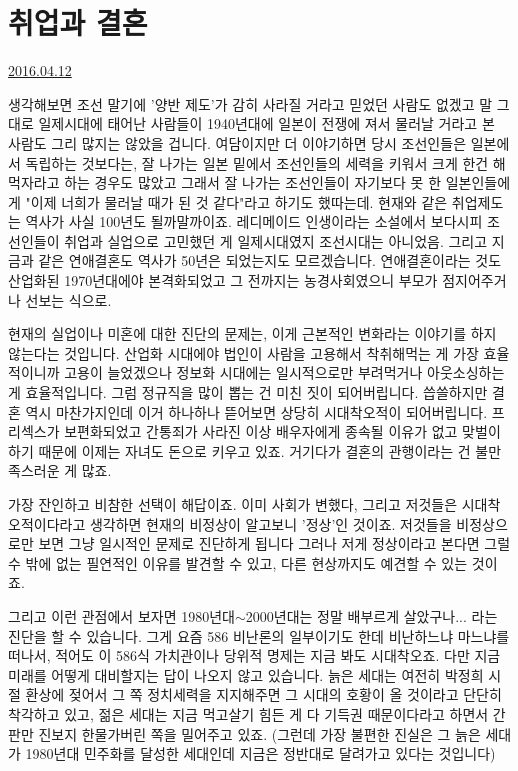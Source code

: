\section{취업과 결혼}
\href{https://www.kockoc.com/Apoc/724863}{2016.04.12}

\vspace{5mm}

생각해보면 조선 말기에 '양반 제도'가 감히 사라질 거라고 믿었던 사람도 없겠고
말 그대로 일제시대에 태어난 사람들이 1940년대에 일본이 전쟁에 져서 물러날 거라고 본 사람도 그리 많지는 않았을 겁니다.
여담이지만 더 이야기하면 당시 조선인들은 일본에서 독립하는 것보다는,
잘 나가는 일본 밑에서 조선인들의 세력을 키워서 크게 한건 해먹자라고 하는 경우도 많았고
그래서 잘 나가는 조선인들이 자기보다 못 한 일본인들에게 "이제 너희가 물러날 때가 된 것 같다"라고 하기도 했따는데.
현재와 같은 취업제도는 역사가 사실 100년도 될까말까이죠.
레디메이드 인생이라는 소설에서 보다시피 조선인들이 취업과 실업으로 고민했던 게 일제시대였지 조선시대는 아니었음.
그리고 지금과 같은 연애결혼도 역사가 50년은 되었는지도 모르겠습니다.
연애결혼이라는 것도 산업화된 1970년대에야 본격화되었고 그 전까지는 농경사회였으니 부모가 점지어주거나 선보는 식으로.
\vspace{5mm}

현재의 실업이나 미혼에 대한 진단의 문제는, 이게 근본적인 변화라는 이야기를 하지 않는다는 것입니다.
산업화 시대에야 법인이 사람을 고용해서 착취해먹는 게 가장 효율적이니까 고용이 늘었겠으나
정보화 시대에는 일시적으로만 부려먹거나 아웃소싱하는 게 효율적입니다. 그럼 정규직을 많이 뽑는 건 미친 짓이 되어버립니다.
씁쓸하지만 결혼 역시 마찬가지인데 이거 하나하나 뜯어보면 상당히 시대착오적이 되어버립니다.
프리섹스가 보편화되었고 간통죄가 사라진 이상 배우자에게 종속될 이유가 없고
맞벌이하기 때문에 이제는 자녀도 돈으로 키우고 있죠. 거기다가 결혼의 관행이라는 건 불만족스러운 게 많죠.
\vspace{5mm}

가장 잔인하고 비참한 선택이 해답이죠.
이미 사회가 변했다, 그리고 저것들은 시대착오적이다라고 생각하면 현재의 비정상이 알고보니 '정상'인 것이죠.
저것들을 비정상으로만 보면 그냥 일시적인 문제로 진단하게 됩니다
그러나 저게 정상이라고 본다면 그럴 수 밖에 없는 필연적인 이유를 발견할 수 있고, 다른 현상까지도 예견할 수 있는 것이죠.
\vspace{5mm}

그리고 이런 관점에서 보자면 1980년대$\sim$2000년대는 정말 배부르게 살았구나... 라는 진단을 할 수 있습니다.
그게 요즘 586 비난론의 일부이기도 한데 비난하느냐 마느냐를 떠나서, 적어도 이 586식 가치관이나 당위적 명제는 지금 봐도 시대착오죠.
다만 지금 미래를 어떻게 대비할지는 답이 나오지 않고 있습니다.
늙은 세대는 여전히 박정희 시절 환상에 젖어서 그 쪽 정치세력을 지지해주면 그 시대의 호황이 올 것이라고 단단히 착각하고 있고,
젊은 세대는 지금 먹고살기 힘든 게 다 기득권 때문이다라고 하면서 간판만 진보지 한물가버린 쪽을 밀어주고 있죠.
(그런데 가장 불편한 진실은 그 늙은 세대가 1980년대 민주화를 달성한 세대인데 지금은 정반대로 달려가고 있다는 것입니다)
\vspace{5mm}

